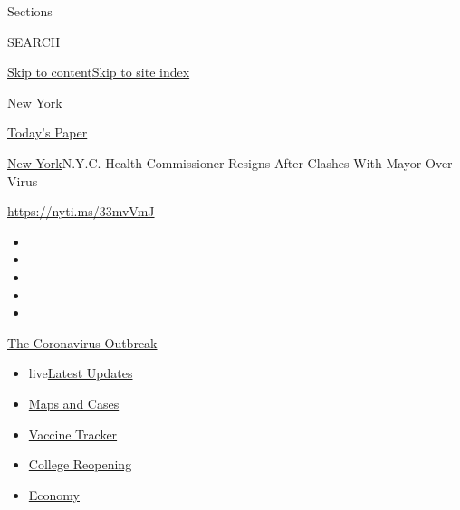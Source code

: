 Sections

SEARCH

\protect\hyperlink{site-content}{Skip to
content}\protect\hyperlink{site-index}{Skip to site index}

\href{https://www.nytimes3xbfgragh.onion/section/nyregion}{New York}

\href{https://myaccount.nytimes3xbfgragh.onion/auth/login?response_type=cookie\&client_id=vi}{}

\href{https://www.nytimes3xbfgragh.onion/section/todayspaper}{Today's
Paper}

\href{/section/nyregion}{New York}\textbar{}N.Y.C. Health Commissioner
Resigns After Clashes With Mayor Over Virus

\url{https://nyti.ms/33mvVmJ}

\begin{itemize}
\item
\item
\item
\item
\item
\end{itemize}

\href{https://www.nytimes3xbfgragh.onion/news-event/coronavirus?action=click\&pgtype=Article\&state=default\&region=TOP_BANNER\&context=storylines_menu}{The
Coronavirus Outbreak}

\begin{itemize}
\tightlist
\item
  live\href{https://www.nytimes3xbfgragh.onion/2020/08/04/world/coronavirus-cases.html?action=click\&pgtype=Article\&state=default\&region=TOP_BANNER\&context=storylines_menu}{Latest
  Updates}
\item
  \href{https://www.nytimes3xbfgragh.onion/interactive/2020/us/coronavirus-us-cases.html?action=click\&pgtype=Article\&state=default\&region=TOP_BANNER\&context=storylines_menu}{Maps
  and Cases}
\item
  \href{https://www.nytimes3xbfgragh.onion/interactive/2020/science/coronavirus-vaccine-tracker.html?action=click\&pgtype=Article\&state=default\&region=TOP_BANNER\&context=storylines_menu}{Vaccine
  Tracker}
\item
  \href{https://www.nytimes3xbfgragh.onion/2020/08/02/us/covid-college-reopening.html?action=click\&pgtype=Article\&state=default\&region=TOP_BANNER\&context=storylines_menu}{College
  Reopening}
\item
  \href{https://www.nytimes3xbfgragh.onion/live/2020/08/04/business/stock-market-today-coronavirus?action=click\&pgtype=Article\&state=default\&region=TOP_BANNER\&context=storylines_menu}{Economy}
\end{itemize}

